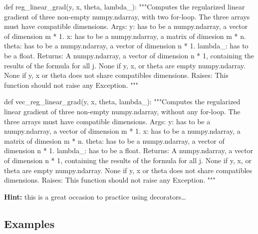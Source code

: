\documentclass[]{article}
\newenvironment{Shaded}{\begin{snugshade}}{\end{snugshade}}
\newcommand{\CommentTok}[1]{\textcolor[rgb]{0.48,0.49,0.49}{#1}}
\newcommand{\KeywordTok}[1]{\textcolor[rgb]{0.81,0.81,0.76}{#1}}
\newcommand{\NormalTok}[1]{\textcolor[rgb]{0.81,0.81,0.76}{#1}}
\begin{document}
\begin{Shaded}
\begin{Highlighting}[]
\KeywordTok{def}\NormalTok{ reg_linear_grad(y, x, theta, lambda_):}
    \CommentTok{"""Computes the regularized linear gradient of three non-empty numpy.ndarray, with two for-loop. The three arrays must have compatible dimensions.}
\CommentTok{    Args:}
\CommentTok{      y: has to be a numpy.ndarray, a vector of dimension m * 1.}
\CommentTok{      x: has to be a numpy.ndarray, a matrix of dimesion m * n.}
\CommentTok{      theta: has to be a numpy.ndarray, a vector of dimension n * 1.}
\CommentTok{      lambda_: has to be a float.}
\CommentTok{    Returns:}
\CommentTok{      A numpy.ndarray, a vector of dimension n * 1, containing the results of the formula for all j.}
\CommentTok{      None if y, x, or theta are empty numpy.ndarray.}
\CommentTok{      None if y, x or theta does not share compatibles dimensions.}
\CommentTok{    Raises:}
\CommentTok{      This function should not raise any Exception.}
\CommentTok{    """}

\KeywordTok{def}\NormalTok{ vec_reg_linear_grad(y, x, theta, lambda_):}
    \CommentTok{"""Computes the regularized linear gradient of three non-empty numpy.ndarray, without any for-loop. The three arrays must have compatible dimensions.}
\CommentTok{    Args:}
\CommentTok{      y: has to be a numpy.ndarray, a vector of dimension m * 1.}
\CommentTok{      x: has to be a numpy.ndarray, a matrix of dimesion m * n.}
\CommentTok{      theta: has to be a numpy.ndarray, a vector of dimension n * 1.}
\CommentTok{      lambda_: has to be a float.}
\CommentTok{    Returns:}
\CommentTok{      A numpy.ndarray, a vector of dimension n * 1, containing the results of the formula for all j.}
\CommentTok{      None if y, x, or theta are empty numpy.ndarray.}
\CommentTok{      None if y, x or theta does not share compatibles dimensions.}
\CommentTok{    Raises:}
\CommentTok{      This function should not raise any Exception.}
\CommentTok{    """}
\end{Highlighting}
\end{Shaded}

\textbf{Hint:} this is a great occasion to practice using
decorators\ldots{}

\hypertarget{examples-6}{%
\subsection{Examples}\label{examples-6}}
\end{document}
